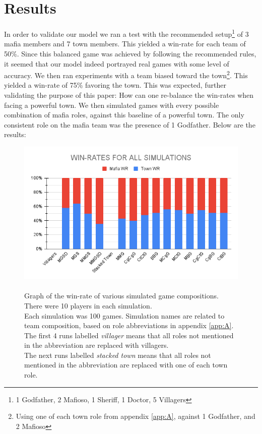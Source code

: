 \section{Results}\label{sec:results}
In order to validate our model we ran a test with the recommended
setup\footnote[1]{1 Godfather, 2 Mafioso, 1 Sheriff, 1 Doctor, 5 Villagers} of
3 mafia members and 7 town members\cite{MafiaRules}. This yielded a win-rate
for each team of 50\%. Since this balanced game was achieved by following the
recommended rules, it seemed that our model indeed portrayed real games with
some level of accuracy. We then ran experiments with a team biased toward the
town\footnote{Using one of each town role from appendix \ref{app:A}, against 1
    Godfather, and 2 Mafioso}. This yielded a win-rate of 75\% favoring the town.
This was expected, further validating the purpose of this paper: How can one
re-balance the win-rates when facing a powerful town. We then simulated games
with every possible combination of mafia roles, against this baseline of a
powerful town. The only consistent role on the mafia team was the presence of 1
Godfather. Below are the results:
\begin{figure}[h]
    \includegraphics[width=1\linewidth]{figures/Winrates}
    \caption{\\Graph of the win-rate of various simulated game compositions.\\
        There were 10 players in each simulation.\\
        Each simulation was 100 games.
        Simulation names are related to team composition, based on role
        abbreviations in appendix \ref{app:A}.\\
        The first 4 runs labelled \textit{villager} means that all roles not
        mentioned in the abbreviation are replaced with villagers.\\
        The next runs labelled \textit{stacked town} means that all roles not
        mentioned in the abbreviation are replaced with	one of each town role.}
    \label{fig:placeholder}
\end{figure}
